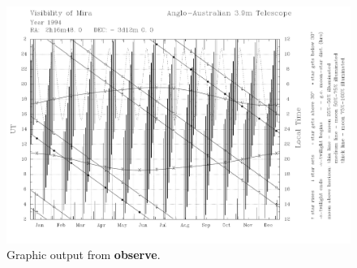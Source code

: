 \documentclass[11pt,noabs]{starlink}
\begin{document}
\newpage

\begin{figure}
\begin{center}
\includegraphics[width=\textwidth]{sun146_fig}
\vspace{5mm}
\caption{Graphic output from {\bf{observe}}.}
\label{fig_output}
\end{center}
\end{figure}
\end{document}
